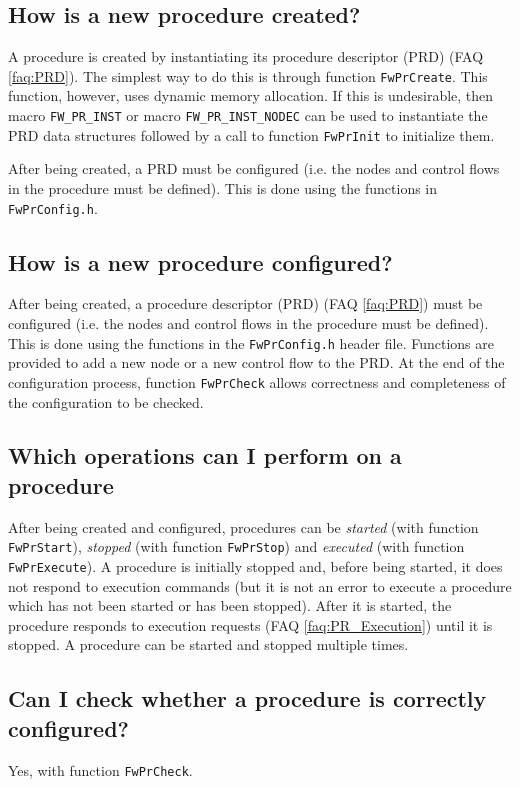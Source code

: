 \documentclass[a4paper,10pt]{article}
\begin{document}
\subsection{How is a new procedure created?}
A procedure is created by instantiating its procedure descriptor (PRD) (FAQ \ref{faq:PRD}). The simplest way to do this is through function \texttt{FwPrCreate}. 
This function, however, uses dynamic memory allocation. If this is undesirable, then macro \texttt{FW\_PR\_INST} 
or macro \texttt{FW\_PR\_INST\_NODEC} can be used to instantiate 
the PRD data structures followed by a call to function \texttt{FwPrInit} to initialize them.

After being created, a PRD must be configured (i.e. the nodes and control flows in the procedure must be defined). This is done using the functions 
in \texttt{FwPrConfig.h}.

\subsection{How is a new procedure configured?}
After being created, a procedure descriptor (PRD) (FAQ \ref{faq:PRD}) must be configured (i.e. the nodes and control flows in the procedure must be defined). 
This is done using the functions in the \texttt{FwPrConfig.h} header file. Functions are provided to add a new node or a new control flow to the PRD. 
At the end of the configuration process, function \texttt{FwPrCheck} allows correctness and completeness of the configuration to be checked.

\subsection{Which operations can I perform on a procedure}
After being created and configured, procedures can be \emph{started} (with function \texttt{FwPrStart}), \emph{stopped} (with function 
\texttt{FwPrStop}) and \emph{executed} (with function \texttt{FwPrExecute}). A procedure is initially stopped and, before being started, 
it does not respond to execution commands (but it is not an error to execute a procedure which has not been started or has been stopped). 
After it is started, the procedure responds to execution requests (FAQ \ref{faq:PR_Execution}) until it is stopped. A procedure can be started 
and stopped multiple times.

\subsection{Can I check whether a procedure is correctly configured?}
Yes, with function \texttt{FwPrCheck}.
\end{document}
